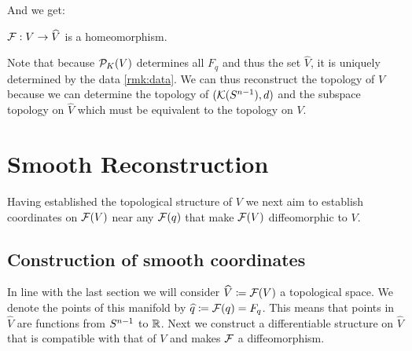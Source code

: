 

    

And we get:
\begin{corollary}\label{cor:Fhomeo}
    $\mathcal{F}:V\to \widehat{V}$ is a homeomorphism.
\end{corollary}

Note that because ${\mathcal{P}}_K(V)$ determines all $F_q$ and thus the set $\widehat{V}$, it is uniquely determined by the data \ref{rmk:data}. We can thus reconstruct the topology of $V$ because we can determine the topology of $({\mathcal{K}}({S^{n-1}}),d)$ and the subspace topology on $\widehat{V}$ which must be equivalent to the topology on $V$.

\section{Smooth Reconstruction}
Having established the topological structure of $V$ we next aim to establish coordinates on $\mathcal{F}(V)$ near any $\mathcal{F}(q)$ that make $\mathcal{F}(V)$ diffeomorphic to $V$.

\subsection{Construction of smooth coordinates}
In line with the last section we will consider $\widehat{V}\coloneqq {\mathcal{F}}(V)$ a topological space. We denote the points of this manifold by $\widehat{q}\coloneqq {\mathcal{F}}(q)=F_q$. This means that points in $\widehat{V}$ are functions from ${S^{n-1}}$ to $\mathbb{R}$.
Next we construct a differentiable structure on $\widehat{V}$ that is compatible with that of $V$ and makes $\mathcal{F}$ a diffeomorphism.

